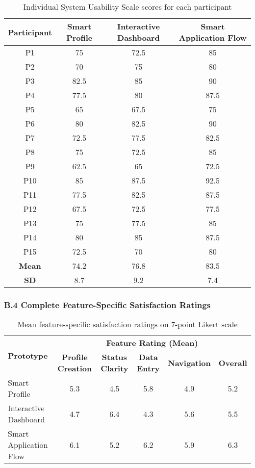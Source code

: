 \documentclass[
	letterpaper, %
]{jdf}
\begin{document}
\begin{table}[h]
\centering
\begin{tabular}{|c|c|c|c|}
\hline
\textbf{Participant} & \textbf{Smart Profile} & \textbf{Interactive Dashboard} & \textbf{Smart Application Flow} \\
\hline
P1 & 75 & 72.5 & 85 \\
\hline
P2 & 70 & 75 & 80 \\
\hline
P3 & 82.5 & 85 & 90 \\
\hline
P4 & 77.5 & 80 & 87.5 \\
\hline
P5 & 65 & 67.5 & 75 \\
\hline
P6 & 80 & 82.5 & 90 \\
\hline
P7 & 72.5 & 77.5 & 82.5 \\
\hline
P8 & 75 & 72.5 & 85 \\
\hline
P9 & 62.5 & 65 & 72.5 \\
\hline
P10 & 85 & 87.5 & 92.5 \\
\hline
P11 & 77.5 & 82.5 & 87.5 \\
\hline
P12 & 67.5 & 72.5 & 77.5 \\
\hline
P13 & 75 & 77.5 & 85 \\
\hline
P14 & 80 & 85 & 87.5 \\
\hline
P15 & 72.5 & 70 & 80 \\
\hline
\textbf{Mean} & 74.2 & 76.8 & 83.5 \\
\hline
\textbf{SD} & 8.7 & 9.2 & 7.4 \\
\hline
\end{tabular}
\caption{Individual System Usability Scale scores for each participant}
\end{table}

\subsubsection{B.4 Complete Feature-Specific Satisfaction Ratings}

\begin{table}[h]
\centering
\begin{tabular}{|l|c|c|c|c|c|}
\hline
\multirow{2}{*}{\textbf{Prototype}} & \multicolumn{5}{c|}{\textbf{Feature Rating (Mean)}} \\
\cline{2-6}
 & \textbf{Profile Creation} & \textbf{Status Clarity} & \textbf{Data Entry} & \textbf{Navigation} & \textbf{Overall} \\
\hline
Smart Profile & 5.3 & 4.5 & 5.8 & 4.9 & 5.2 \\
\hline
Interactive Dashboard & 4.7 & 6.4 & 4.3 & 5.6 & 5.5 \\
\hline
Smart Application Flow & 6.1 & 5.2 & 6.2 & 5.9 & 6.3 \\
\hline
\end{tabular}
\caption{Mean feature-specific satisfaction ratings on 7-point Likert scale}
\end{table}
\end{document}
